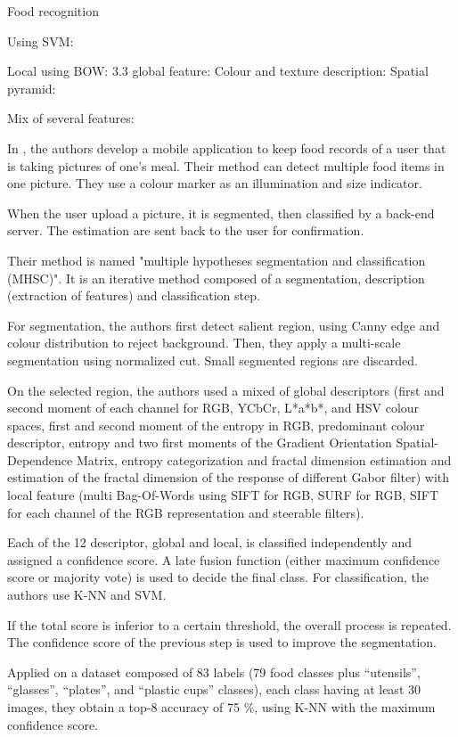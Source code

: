 Food recognition

Using SVM:

Local using BOW: 3.3
global feature:
Colour and texture description: 
Spatial pyramid:

Mix of several features:

In \cite{Zhu2015}, the authors develop a mobile application to keep food records of a user that is taking pictures of one's meal. Their method can detect multiple food items in one picture. They use a colour marker as an illumination and size indicator.

When the user upload a picture, it is segmented, then classified by a back-end server. The estimation are sent back to the user for confirmation.

Their method is named "multiple hypotheses segmentation and classification (MHSC)". It is an iterative method composed of a segmentation, description (extraction of features) and classification step.

For segmentation, the authors first detect salient region, using Canny edge and colour distribution to reject background. Then, they apply a multi-scale segmentation using normalized cut. Small segmented regions are discarded.

On the selected region, the authors used a mixed of global descriptors (first and second moment of each channel for RGB, YCbCr, L*a*b*, and HSV colour spaces, first and second moment of the entropy in RGB, predominant colour descriptor, entropy and two first moments of the Gradient Orientation Spatial-Dependence Matrix, entropy categorization and fractal dimension estimation and estimation of the fractal dimension of the response of different Gabor filter) with local feature (multi Bag-Of-Words using SIFT for RGB, SURF for RGB, SIFT for each channel of the RGB representation and steerable filters).

Each of the 12 descriptor, global and local, is classified independently and assigned a confidence score. A late fusion function (either maximum confidence score or majority vote) is used  to decide the final class. For classification, the authors use K-NN and SVM.

If the total score is inferior to a certain threshold, the overall process is repeated. The confidence score of the previous step is used to improve the segmentation.

Applied on a dataset composed of 83 labels (79 food classes plus \enquote{utensils}, \enquote{glasses}, \enquote{plates}, and \enquote{plastic cups} classes), each class having at least 30 images, they obtain a top-8 accuracy of 75 \%, using K-NN with the maximum confidence score.

